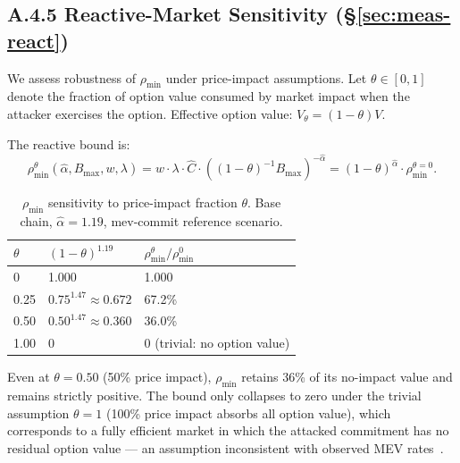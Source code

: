 \subsection*{A.4.5 Reactive-Market Sensitivity (\S\ref{sec:meas-react})}

We assess robustness of $\rho_{\min}$ under price-impact assumptions.
Let $\theta \in [0, 1]$ denote the fraction of option value consumed by
market impact when the attacker exercises the option. Effective option value:
$V_\theta = (1-\theta) V$.

The reactive bound is:
\[
  \rho_{\min}^\theta(\hat{\alpha}, B_{\max}, w, \lambda)
  = w \cdot \lambda \cdot \hat{C} \cdot ((1-\theta)^{-1} B_{\max})^{-\hat{\alpha}}
  = (1-\theta)^{\hat{\alpha}} \cdot \rho_{\min}^{\theta=0}.
\]

\begin{table}[h]
\centering
\small
\caption{$\rho_{\min}$ sensitivity to price-impact fraction $\theta$.
  Base chain, $\hat{\alpha} = 1.19$, mev-commit reference scenario.}
\label{tab:rhomin-sensitivity}
\begin{tabular}{@{}lll@{}}
\toprule
$\theta$ & $(1-\theta)^{1.19}$ & $\rho_{\min}^\theta / \rho_{\min}^0$ \\
\midrule
0    & 1.000 & 1.000 \\
0.25 & $0.75^{1.47} \approx 0.672$ & 67.2\% \\
0.50 & $0.50^{1.47} \approx 0.360$ & 36.0\% \\
1.00 & 0 & 0 (trivial: no option value) \\
\bottomrule
\end{tabular}
\end{table}

\noindent Even at $\theta = 0.50$ (50\% price impact), $\rho_{\min}$ retains
36\% of its no-impact value and remains strictly positive. The bound only
collapses to zero under the trivial assumption $\theta = 1$ (100\% price
impact absorbs all option value), which corresponds to a fully efficient market
in which the attacked commitment has no residual option value --- an assumption
inconsistent with observed MEV rates~\cite{Flashbots2023}.
